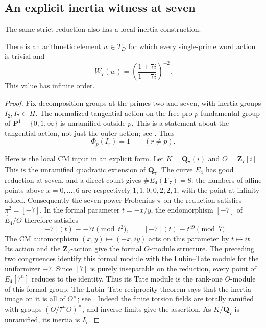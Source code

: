 \subsection{An explicit inertia witness at seven}
The same strict reduction also has a local inertia construction.
\begin{proposition}\label{prop:seven-inertia-mixed-prime-witness}
There is an arithmetic element \(w\in T_D\) for which every
single-prime word action is trivial and
\[
 W_7(w)=\left(\frac{1+7i}{1-7i}\right)^{-2}.
\]
This value has infinite order.
\end{proposition}
\begin{proof}
Fix decomposition groups at the primes two and seven,
with inertia groups \(I_2,I_7\subset H\).  The normalized
tangential action on the free pro-\(p\) fundamental group of
\(\mathbf P^1-\{0,1,\infty\}\) is unramified outside \(p\).
This is a statement about the tangential action, not just the
outer action; see \cite[\S8.5]{HainMatsumoto2003}.  Thus
\begin{equation}\label{eq:disjoint-inertia-word-actions}
                  \Phi_p(I_r)=1\qquad(r\ne p).
\end{equation}

Here is the local CM input in an explicit form.  Let
\(K=\mathbf Q_7(i)\) and \(O=\mathbf Z_7[i]\).
This is the unramified quadratic extension of \(\mathbf Q_7\).
The curve \(E_4\) has good reduction at seven, and a direct
count gives \(\#E_4(\mathbf F_7)=8\): the numbers of affine
points above \(x=0,\ldots,6\) are respectively
\(1,1,0,0,2,2,1\), with the point at infinity added.
Consequently the seven-power Frobenius \(\pi\) on the
reduction satisfies \(\pi^2=[-7]\).
In the formal parameter \(t=-x/y\), the endomorphism
\([-7]\) of \(\widehat E_4/O\) therefore satisfies
\[
 [-7](t)\equiv-7t\pmod{t^2},\qquad
 [-7](t)\equiv t^{49}\pmod7.
\]
The CM automorphism \((x,y)\mapsto(-x,iy)\) acts on this
parameter by \(t\mapsto it\).  Its action and the
\(\mathbf Z_7\)-action give the formal \(O\)-module structure.
The preceding two congruences identify this formal module
with the Lubin--Tate module for the uniformizer \(-7\).
Since \([7]\) is purely inseparable on the reduction, every
point of \(E_4[7^n]\) reduces to the identity.  Thus its
Tate module is the rank-one \(O\)-module of this formal
group.  The Lubin--Tate reciprocity theorem says that the
inertia image on it is all of \(O^\times\); see
\cite[p.~380, the displayed reciprocity formula~(2)]{LubinTate1965}.
Indeed the finite torsion fields are totally ramified with
groups \((O/7^nO)^\times\), and inverse limits give the
assertion.  As \(K/\mathbf Q_7\) is unramified, its inertia
is \(I_7\).


\end{proof}
